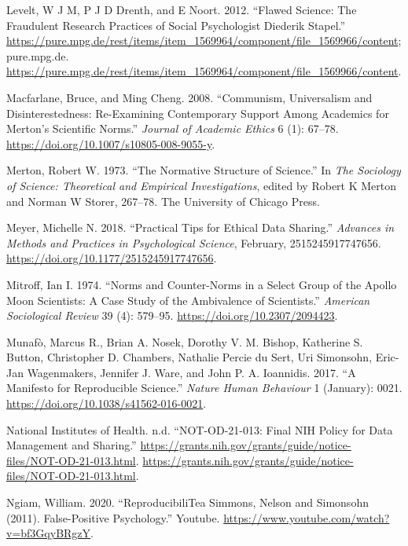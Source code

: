 \documentclass[
  letterpaper,
  DIV=11,
  numbers=noendperiod]{scrartcl}
\newlength{\cslhangindent}
\newenvironment{CSLReferences}[2] %
 {\begin{list}{}{%
  \setlength{\itemindent}{0pt}
  \setlength{\leftmargin}{0pt}
  \setlength{\parsep}{0pt}
  \ifodd #1
   \setlength{\leftmargin}{\cslhangindent}
   \setlength{\itemindent}{-1\cslhangindent}
  \fi
  \setlength{\itemsep}{#2\baselineskip}}}
 {\end{list}}
\begin{document}
\begin{CSLReferences}{1}{0}
Levelt, W J M, P J D Drenth, and E Noort. 2012. {``Flawed Science: The
Fraudulent Research Practices of Social Psychologist Diederik Stapel.''}
\url{https://pure.mpg.de/rest/items/item_1569964/component/file_1569966/content};
pure.mpg.de.
\url{https://pure.mpg.de/rest/items/item_1569964/component/file_1569966/content}.

Macfarlane, Bruce, and Ming Cheng. 2008. {``Communism, Universalism and
Disinterestedness: Re-Examining Contemporary Support Among Academics for
Merton's Scientific Norms.''} \emph{Journal of Academic Ethics} 6 (1):
67--78. \url{https://doi.org/10.1007/s10805-008-9055-y}.

Merton, Robert W. 1973. {``The Normative Structure of Science.''} In
\emph{The {S}ociology of {S}cience: {T}heoretical and {E}mpirical
{I}nvestigations}, edited by Robert K Merton and Norman W Storer,
267--78. The University of Chicago Press.

Meyer, Michelle N. 2018. {``Practical Tips for Ethical Data Sharing.''}
\emph{Advances in Methods and Practices in Psychological Science},
February, 2515245917747656.
\url{https://doi.org/10.1177/2515245917747656}.

Mitroff, Ian I. 1974. {``Norms and Counter-Norms in a Select Group of
the {A}pollo Moon Scientists: A Case Study of the Ambivalence of
Scientists.''} \emph{American Sociological Review} 39 (4): 579--95.
\url{https://doi.org/10.2307/2094423}.

Munafò, Marcus R., Brian A. Nosek, Dorothy V. M. Bishop, Katherine S.
Button, Christopher D. Chambers, Nathalie Percie du Sert, Uri Simonsohn,
Eric-Jan Wagenmakers, Jennifer J. Ware, and John P. A. Ioannidis. 2017.
{``A Manifesto for Reproducible Science.''} \emph{Nature Human
Behaviour} 1 (January): 0021.
\url{https://doi.org/10.1038/s41562-016-0021}.

National Institutes of Health. n.d. {``{NOT-OD-21-013}: Final {NIH}
Policy for Data Management and Sharing.''}
\url{https://grants.nih.gov/grants/guide/notice-files/NOT-OD-21-013.html}.
\url{https://grants.nih.gov/grants/guide/notice-files/NOT-OD-21-013.html}.

Ngiam, William. 2020. {``{ReproducibiliTea} \textbar{} Simmons, Nelson
and Simonsohn (2011). {False-Positive} Psychology.''} Youtube.
\url{https://www.youtube.com/watch?v=bf3GqyBRgzY}.


\end{CSLReferences}
\end{document}
